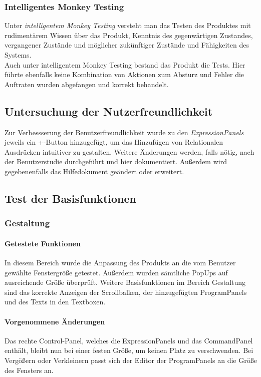 \documentclass[parskip=full]{scrartcl}
\begin{document}
\subsubsection{Intelligentes Monkey Testing}
Unter \textit{intelligentem Monkey Testing} versteht man das Testen des Produktes mit rudimentärem Wissen über das Produkt, Kenntnis des gegenwärtigen Zustandes, vergangener Zustände und  möglicher zukünftiger Zustände und Fähigkeiten des Systems. \\
Auch unter intelligentem Monkey Testing bestand das Produkt die Tests. Hier führte ebenfalls keine Kombination von Aktionen zum Absturz und Fehler die Auftraten wurden abgefangen und korrekt behandelt.

\subsection{Untersuchung der Nutzerfreundlichkeit}\label{usertestimdoc}
Zur Verbessserung der Benutzerfreundlichkeit wurde zu den \textit{ExpressionPanels} jeweils ein +-Button hinzugefügt, um das Hinzufügen von Relationalen Ausdrücken intuitiver zu gestalten.
Weitere Änderungen werden, falls nötig, nach der Benutzerstudie durchgeführt und hier dokumentiert. Außerdem wird gegebenenfalls das Hilfedokument geändert oder erweitert.

\subsection{Test der Basisfunktionen}
\subsubsection{Gestaltung}
\paragraph{Getestete Funktionen}
In diesem Bereich wurde die Anpassung des Produkts an die vom Benutzer gewählte Fenstergröße getestet. Außerdem wurden sämtliche PopUps auf ausreichende Größe überprüft.
Weitere Basisfunktionen im Bereich Gestaltung sind das korrekte Anzeigen der Scrollbalken, der hinzugefügten ProgramPanels und des Texts in den Textboxen.
\paragraph{Vorgenommene Änderungen}
Das rechte Control-Panel, welches die ExpressionPanels und das CommandPanel enthält, bleibt nun bei einer festen Größe, um keinen Platz zu verschwenden. Bei Vergößern oder Verkleinern passt sich der Editor der ProgramPanels an die Größe des Fensters an.
\end{document}
